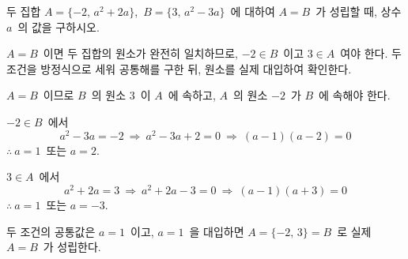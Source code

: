 \documentclass[10pt]{article}
\begin{document}
\dmchecktitle



\newpage


\begin{dmproblem}
두 집합 $A = \{-2,\, a^{2} + 2a\}$,\ $B = \{3,\, a^{2} - 3a\}$\ 에 대하여 $A = B$\ 가 성립할 때, 상수 $a$\ 의 값을 구하시오.
\end{dmproblem}

\begin{dmapproach}
$A = B$\ 이면 두 집합의 원소가 완전히 일치하므로, $-2 \in B$\ 이고 $3 \in A$\ 여야 한다. 두 조건을 방정식으로 세워 공통해를 구한 뒤, 원소를 실제 대입하여 확인한다.
\end{dmapproach}

\begin{dmsolution}
$A = B$\ 이므로 $B$\ 의 원소 $3$\ 이 $A$\ 에 속하고, $A$\ 의 원소 $-2$\ 가 $B$\ 에 속해야 한다.

$-2 \in B$\ 에서
\[ a^{2} - 3a = -2\ \Longrightarrow\ a^{2} - 3a + 2 = 0\ \Longrightarrow\ (a - 1)(a - 2) = 0 \]
$\therefore\ a = 1$\ 또는 $a = 2$.

$3 \in A$\ 에서
\[ a^{2} + 2a = 3\ \Longrightarrow\ a^{2} + 2a - 3 = 0\ \Longrightarrow\ (a - 1)(a + 3) = 0 \]
$\therefore\ a = 1$\ 또는 $a = -3$.

두 조건의 공통값은 $a = 1$\ 이고, $a = 1$\ 을 대입하면 $A = \{-2,\, 3\} = B$\ 로 실제 $A = B$\ 가 성립한다.
\end{dmsolution}

\dmchecktitle


\end{document}
